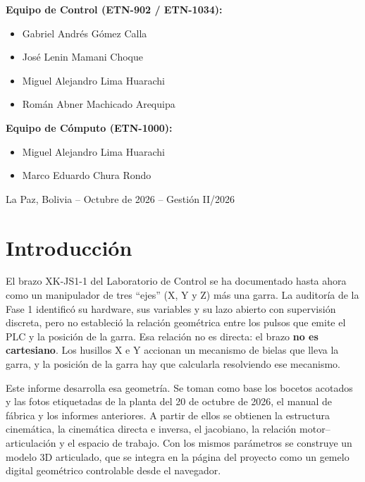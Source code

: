 \documentclass[a4paper,12pt]{article}
\begin{document}
\begin{titlepage}
\vspace{0.8cm}
\begin{minipage}[t]{0.55\textwidth}
\textbf{Equipo de Control (ETN-902 / ETN-1034):}
\begin{itemize}\setlength\itemsep{0pt}
\item Gabriel Andrés Gómez Calla
\item José Lenin Mamani Choque
\item Miguel Alejandro Lima Huarachi
\item Román Abner Machicado Arequipa
\end{itemize}
\end{minipage}\hfill
\begin{minipage}[t]{0.42\textwidth}
\textbf{Equipo de Cómputo (ETN-1000):}
\begin{itemize}\setlength\itemsep{0pt}
\item Miguel Alejandro Lima Huarachi
\item Marco Eduardo Chura Rondo
\end{itemize}
\end{minipage}

\vfill
\begin{center}
La Paz, Bolivia -- Octubre de 2026 -- Gestión II/2026
\end{center}
\end{titlepage}
\normalcolor

\tableofcontents
\newpage

\section{Introducción}

El brazo XK-JS1-1 del Laboratorio de Control se ha documentado hasta ahora como un manipulador de tres
``ejes'' (X, Y y Z) más una garra. La auditoría de la Fase 1 identificó su hardware, sus variables y su
lazo abierto con supervisión discreta, pero no estableció la relación geométrica entre los pulsos que emite
el PLC y la posición de la garra. Esa relación no es directa: el brazo \textbf{no es cartesiano}. Los
husillos X e Y accionan un mecanismo de bielas que lleva la garra, y la posición de la garra hay que
calcularla resolviendo ese mecanismo.

Este informe desarrolla esa geometría. Se toman como base los bocetos acotados y las fotos etiquetadas de la
planta del 20 de octubre de 2026, el manual de fábrica y los informes anteriores. A partir de ellos se
obtienen la estructura cinemática, la cinemática directa e inversa, el jacobiano, la relación
motor--articulación y el espacio de trabajo. Con los mismos parámetros se construye un modelo 3D articulado,
que se integra en la página del proyecto como un gemelo digital geométrico controlable desde el navegador.
\end{document}
